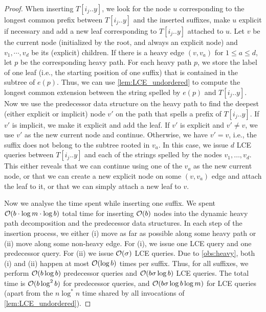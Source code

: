 \begin{proof}
%
When inserting $T[i_j .. y]$, we look for the node $u$ corresponding to the longest common prefix between $T[i_j .. y]$ and the inserted suffixes, make $u$ explicit if necessary and add a new leaf corresponding to $T[i_j .. y]$ attached to $u$.
Let $v$ be the current node (initialized by the root, and always an explicit node) and $v_1, \cdots, v_d$ be its (explicit) children. If there is a heavy edge $(v, v_a)$ for $1 \leq a \leq d$, let $p$ be the corresponding heavy path.
For each heavy path $p$, we store the label of one leaf (i.e., the starting position of one suffix) that is contained in the subtree of $e(p)$. 
Thus, we can use \cref{lem:LCE_undordered} to
compute the longest common extension between the string spelled by $e(p)$ and $T[i_j .. y]$.
Now we use the predecessor data structure on the heavy path to find the deepest (either explicit or implicit) node $v'$ on the path that spells a prefix of $T[i_j .. y]$. If $v'$ is implicit, we make it explicit and add the leaf. If $v'$ is explicit and $v' \neq v$, we use $v'$ as the new current node and continue. Otherwise, we have $v' = v$, i.e., the suffix does not belong to the subtree rooted in $v_a$. In this case, we issue $d$ LCE queries between $T[i_j .. y]$ and each of the strings spelled by the nodes $v_1, \dots, v_d$. This either reveals that we can continue using one of the $v_a$ as the new current node, or that we can create a new explicit node on some $(v, v_a)$ edge and attach the leaf to it, or that we can simply attach a new leaf to $v$.

Now we analyse the time spent while inserting one suffix. We spent $\mathcal{O}(b \cdot \log m \cdot \log b)$ total time for inserting $\mathcal{O}(b)$ nodes into the dynamic heavy path decomposition and the predecessor data structures. In each step of the insertion process, we either (i) move as far as possible along some heavy path or (ii) move along some non-heavy edge. For (i), we issue one LCE query and one predecessor query. For (ii) we issue $\mathcal{O}(\sigma)$ LCE queries.
Due to \cref{obs:heavy}, both (i) and (ii) happen at most $\mathcal{O}(\log b)$ times per suffix. Thus, for all suffixes, we perform $\mathcal{O}(b \log b)$ predecessor queries and $\mathcal{O}(b\sigma \log b)$ LCE queries. The total time is $\mathcal{O}(b \log^2 b)$ for predecessor queries, and $\mathcal{O}(b\sigma \log b \log m)$ for LCE queries (apart from the $n \log^* n$ time shared by all invocations of \cref{lem:LCE_undordered}).
\end{proof}


\newcommand{\maxleft}{\textnormal{\textsf{src}}}
\newcommand{\maxleftlce}{\textnormal{\textsf{len}}}
\newcommand{\phraseend}{\textnormal{\textsf{phraseEnd}}}

